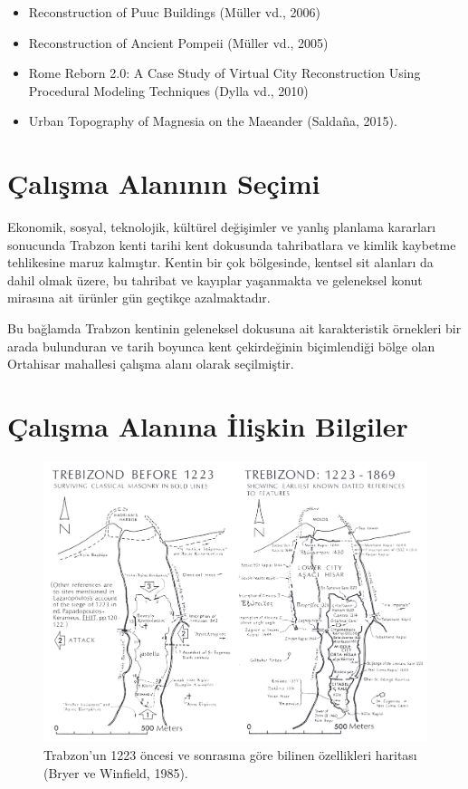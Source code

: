 \documentclass[12pt,turkish,a4paperpaper,]{report}
\providecommand{\tightlist}{%
  \setlength{\itemsep}{0pt}\setlength{\parskip}{0pt}}
\begin{document}
\begin{itemize}
\tightlist
\item
  Reconstruction of Puuc Buildings (Müller vd., 2006)
\item
  Reconstruction of Ancient Pompeii (Müller vd., 2005)
\item
  Rome Reborn 2.0: A Case Study of Virtual City Reconstruction Using
  Procedural Modeling Techniques (Dylla vd., 2010)
\item
  Urban Topography of Magnesia on the Maeander (Saldaña, 2015).
\end{itemize}

\hypertarget{uxe7alux131ux15fma-alanux131nux131n-seuxe7imi}{%
\section{Çalışma Alanının
Seçimi}\label{uxe7alux131ux15fma-alanux131nux131n-seuxe7imi}}

Ekonomik, sosyal, teknolojik, kültürel değişimler ve yanlış planlama
kararları sonucunda Trabzon kenti tarihi kent dokusunda tahribatlara ve
kimlik kaybetme tehlikesine maruz kalmıştır. Kentin bir çok bölgesinde,
kentsel sit alanları da dahil olmak üzere, bu tahribat ve kayıplar
yaşanmakta ve geleneksel konut mirasına ait ürünler gün geçtikçe
azalmaktadır.

Bu bağlamda Trabzon kentinin geleneksel dokusuna ait karakteristik
örnekleri bir arada bulunduran ve tarih boyunca kent çekirdeğinin
biçimlendiği bölge olan Ortahisar mahallesi çalışma alanı olarak
seçilmiştir.

\hypertarget{uxe7alux131ux15fma-alanux131na-iliux15fkin-bilgiler}{%
\section{Çalışma Alanına İlişkin Bilgiler
}\label{uxe7alux131ux15fma-alanux131na-iliux15fkin-bilgiler}}

\begin{figure}
\centering
\includegraphics[width=1\textwidth,height=\textheight]{source/figures/TrabzonMap.png}
\caption{Trabzon'un 1223 öncesi ve sonrasına göre bilinen özellikleri
haritası (Bryer ve Winfield, 1985).}
\end{figure}
\end{document}
